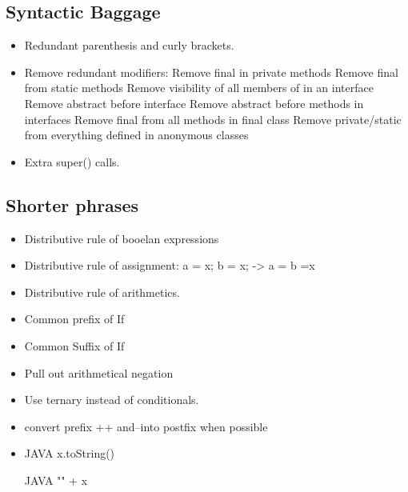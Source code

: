 \subsection{Syntactic Baggage}
\begin{itemize}
  \item Redundant parenthesis and curly brackets.
  \item Remove redundant modifiers: Remove final in private methods
        Remove final from static methods
        Remove visibility of all members of in an interface
        Remove abstract before interface
        Remove abstract before methods in interfaces
        Remove final from all methods in final class
        Remove private/static from everything defined in anonymous classes
  \item Extra super() calls.
\end{itemize}

\subsection{Shorter phrases}
\begin{itemize}
  \item Distributive rule of booelan expressions
  \item Distributive rule of assignment: a = x; b = x; -> a = b =x
  \item Distributive rule of arithmetics.
  \item Common prefix of If
  \item Common Suffix of If
  \item Pull out arithmetical negation
  \item Use ternary instead of conditionals.
  \item convert prefix ++ and--into postfix when possible
  \item
\begin{code}{JAVA}
x.toString()
\end{code}
\begin{code}{JAVA}
"" + x
\end{code}
\end{itemize}

